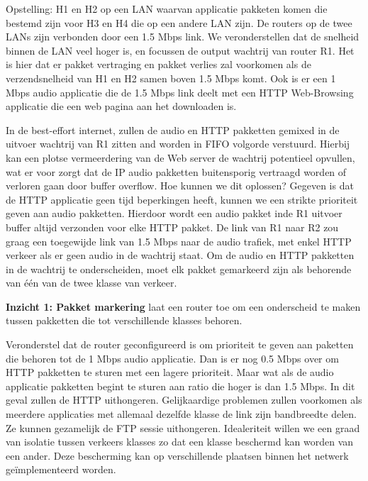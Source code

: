 
\noindent Opstelling: H1 en H2 op een LAN waarvan applicatie pakketen komen die bestemd zijn voor H3 en H4 die op een andere LAN zijn. De routers op de twee LANs zijn verbonden door een 1.5 Mbps link. We veronderstellen dat de snelheid binnen de LAN veel hoger is, en focussen de output wachtrij van router R1. Het is hier dat er pakket vertraging en pakket verlies zal voorkomen als de verzendsnelheid van H1 en H2 samen boven 1.5 Mbps komt. Ook is er een 1 Mbps audio applicatie die de 1.5 Mbps link deelt met een HTTP Web-Browsing applicatie die een web pagina aan het downloaden is.

\noindent In de best-effort internet, zullen de audio en HTTP pakketten gemixed in de uitvoer wachtrij van R1 zitten and worden in FIFO volgorde verstuurd. Hierbij kan een plotse vermeerdering van de Web server de wachtrij potentieel opvullen, wat er voor zorgt dat de IP audio pakketten buitensporig vertraagd worden of verloren gaan door buffer overflow.
Hoe kunnen we dit oplossen? Gegeven is dat de HTTP applicatie geen tijd beperkingen heeft, kunnen we een strikte prioriteit geven aan audio pakketten. Hierdoor wordt een audio pakket inde R1 uitvoer buffer altijd verzonden voor elke HTTP pakket. De link van R1 naar R2 zou graag een toegewijde link van 1.5 Mbps naar de audio trafiek, met enkel HTTP verkeer als er geen audio in de wachtrij staat. Om de audio en HTTP pakketten in de wachtrij te onderscheiden, moet elk pakket gemarkeerd zijn als behorende van één van de twee klasse van verkeer.

\noindent \textbf{Inzicht 1: Pakket markering} laat een router toe om een onderscheid te maken tussen pakketten die tot verschillende klasses behoren.

\noindent Veronderstel dat de router geconfigureerd is om prioriteit te geven aan paketten die behoren tot de 1 Mbps audio applicatie. Dan is er nog 0.5 Mbps over om HTTP pakketten te sturen met een lagere prioriteit. Maar wat als de audio applicatie pakketten begint te sturen aan ratio die hoger is dan 1.5 Mbps. In dit geval zullen de HTTP uithongeren. Gelijkaardige problemen zullen voorkomen als meerdere applicaties met allemaal dezelfde klasse de link zijn bandbreedte delen. Ze kunnen gezamelijk de FTP sessie uithongeren. Idealeriteit willen we een graad van isolatie tussen verkeers klasses zo dat een klasse beschermd kan worden van een ander. Deze bescherming kan op verschillende plaatsen binnen het netwerk geïmplementeerd worden.




